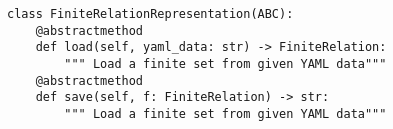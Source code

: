 \begin{verbatim}
class FiniteRelationRepresentation(ABC):
    @abstractmethod
    def load(self, yaml_data: str) -> FiniteRelation:
        """ Load a finite set from given YAML data"""
    @abstractmethod
    def save(self, f: FiniteRelation) -> str:
        """ Load a finite set from given YAML data"""
\end{verbatim}